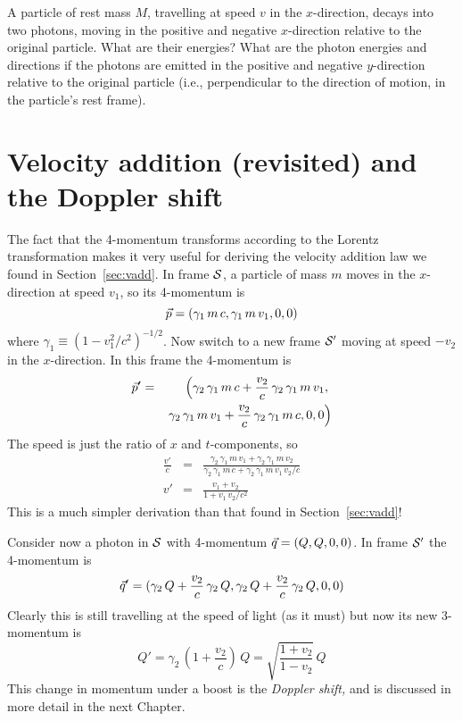 \begin{problem}
A particle of rest mass $M$, travelling at speed $v$ in the
$x$-direction, decays into two photons, moving in the positive and
negative $x$-direction relative to the original particle.  What are
their energies?  What are the photon energies and directions if the
photons are emitted in the positive and negative $y$-direction
relative to the original particle (i.e., perpendicular to the
direction of motion, in the particle's rest frame).
\end{problem}


\section{Velocity addition (revisited) and the Doppler shift}
\label{sec:vadd2}

The fact that the 4-momentum transforms according to the Lorentz
transformation makes it very useful for deriving the velocity addition
law we found in Section~\ref{sec:vadd}.  In frame $\cal S$, a
particle of mass $m$ moves in the $x$-direction at speed $v_1$, so its
4-momentum is
\begin{equation}
\vec{p}=(\gamma_1\,m\,c, \gamma_1\,m\,v_1, 0, 0)
\end{equation}
where $\gamma_1\equiv (1-v_1^2/c^2)^{-1/2}$.  Now switch to a new
frame $\cal S'$ moving at speed $-v_2$ in the $x$-direction.  In this
frame the 4-momentum is
\begin{eqnarray}
\vec{p}' & = &
\left(\gamma_2\,\gamma_1\,m\,c +
\frac{v_2}{c}\,\gamma_2\,\gamma_1\,m\,v_1,\right.
\nonumber\\
& & \left.\gamma_2\,\gamma_1\,m\,v_1 + \frac{v_2}{c}\,\gamma_2\,\gamma_1\,m\,c,
0, 0\right)
\end{eqnarray}
The speed is just the ratio of $x$ and $t$-components, so
\begin{eqnarray}
\frac{v'}{c} & = & \frac{
\gamma_2\,\gamma_1\,m\,v_1 + \gamma_2\,\gamma_1\,m\,v_2}{
\gamma_2\,\gamma_1\,m\,c + \gamma_2\,\gamma_1\,m\,v_1\,v_2/c}
\nonumber \\
v' & = & \frac{v_1+v_2}{1+v_1\,v_2/c^2}
\end{eqnarray}
This is a much simpler derivation than that found in Section~\ref{sec:vadd}!

Consider now a photon in $\cal S$ with 4-momentum $\vec{q}=(Q,Q,0,0)$.
In frame $\cal S'$ the 4-momentum is
\begin{equation}
\vec{q}'=(\gamma_2\,Q+\frac{v_2}{c}\,\gamma_2\,Q,
\gamma_2\,Q+\frac{v_2}{c}\,\gamma_2\,Q,0,0)
\end{equation}
Clearly this is still travelling at the speed of light (as it must)
but now its new 3-momentum is
\begin{equation}
Q'=\gamma_2\,\left(1+\frac{v_2}{c}\right)\,Q=\sqrt{\frac{1+v_2}{1-v_2}}\,Q
\end{equation}
This change in momentum under a boost is the {\em Doppler shift,} and
is discussed in more detail in the next Chapter.


